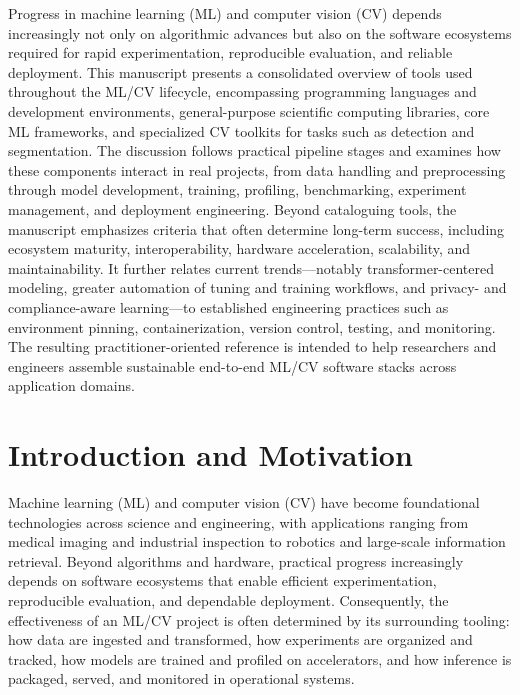 \documentclass{article}
\begin{document}
Progress in machine learning (ML) and computer vision (CV) depends increasingly not only on algorithmic advances but also on the software ecosystems required for rapid experimentation, reproducible evaluation, and reliable deployment. This manuscript presents a consolidated overview of tools used throughout the ML/CV lifecycle, encompassing programming languages and development environments, general-purpose scientific computing libraries, core ML frameworks, and specialized CV toolkits for tasks such as detection and segmentation. The discussion follows practical pipeline stages and examines how these components interact in real projects, from data handling and preprocessing through model development, training, profiling, benchmarking, experiment management, and deployment engineering. Beyond cataloguing tools, the manuscript emphasizes criteria that often determine long-term success, including ecosystem maturity, interoperability, hardware acceleration, scalability, and maintainability. It further relates current trends---notably transformer-centered modeling, greater automation of tuning and training workflows, and privacy- and compliance-aware learning---to established engineering practices such as environment pinning, containerization, version control, testing, and monitoring. The resulting practitioner-oriented reference is intended to help researchers and engineers assemble sustainable end-to-end ML/CV software stacks across application domains.




\clearpage




\renewcommand{\contentsname}{Table of Contents}

\tableofcontents




\clearpage




\section{Introduction and Motivation}

Machine learning (ML) and computer vision (CV) have become foundational technologies across science and engineering, with applications ranging from medical imaging and industrial inspection to robotics and large-scale information retrieval. Beyond algorithms and hardware, practical progress increasingly depends on software ecosystems that enable efficient experimentation, reproducible evaluation, and dependable deployment. Consequently, the effectiveness of an ML/CV project is often determined by its surrounding tooling: how data are ingested and transformed, how experiments are organized and tracked, how models are trained and profiled on accelerators, and how inference is packaged, served, and monitored in operational systems.
\end{document}

